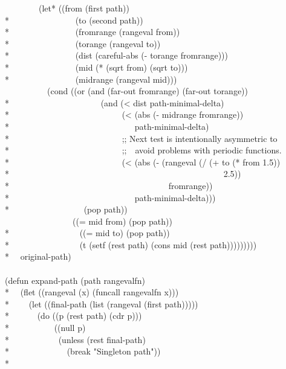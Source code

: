 \begin{new}
\begin{lisp}
~~~~~~~~(let* ((from (first path)) \\*
~~~~~~~~~~~~~~~(to (second path)) \\*
~~~~~~~~~~~~~~~(fromrange (rangeval from)) \\*
~~~~~~~~~~~~~~~(torange (rangeval to)) \\*
~~~~~~~~~~~~~~~(dist (careful-abs (- torange fromrange))) \\*
~~~~~~~~~~~~~~~(mid (* (sqrt from) (sqrt to))) \\*
~~~~~~~~~~~~~~~(midrange (rangeval mid))) \\
~~~~~~~~~~(cond ((or (and (far-out fromrange) (far-out torange)) \\*
~~~~~~~~~~~~~~~~~~~~~(and (< dist path-minimal-delta) \\*
~~~~~~~~~~~~~~~~~~~~~~~~~~(< (abs (- midrange fromrange)) \\*
~~~~~~~~~~~~~~~~~~~~~~~~~~~~~path-minimal-delta) \\*
~~~~~~~~~~~~~~~~~~~~~~~~~~;; Next test is intentionally asymmetric to \\*
~~~~~~~~~~~~~~~~~~~~~~~~~~;;~~avoid problems with periodic functions. \\*
~~~~~~~~~~~~~~~~~~~~~~~~~~(< (abs (- (rangeval (/ (+ to (* from 1.5)) \\*
~~~~~~~~~~~~~~~~~~~~~~~~~~~~~~~~~~~~~~~~~~~~~~~~~~2.5)) \\*
~~~~~~~~~~~~~~~~~~~~~~~~~~~~~~~~~~~~~fromrange)) \\*
~~~~~~~~~~~~~~~~~~~~~~~~~~~~~path-minimal-delta))) \\*
~~~~~~~~~~~~~~~~~(pop path)) \\
~~~~~~~~~~~~~~~~((= mid from) (pop path)) \\*
~~~~~~~~~~~~~~~~((= mid to) (pop path)) \\*
~~~~~~~~~~~~~~~~(t (setf (rest path) (cons mid (rest path))))))))) \\*
~~original-path) \\
\\
(defun expand-path (path rangevalfn) \\*
~~(flet ((rangeval (x) (funcall rangevalfn x))) \\*
~~~~(let ((final-path (list (rangeval (first path))))) \\*
~~~~~~(do ((p (rest path) (cdr p))) \\*
~~~~~~~~~~((null p) \\*
~~~~~~~~~~~(unless (rest final-path) \\*
~~~~~~~~~~~~~(break "Singleton path")) \\*

\end{lisp}
\end{new}
